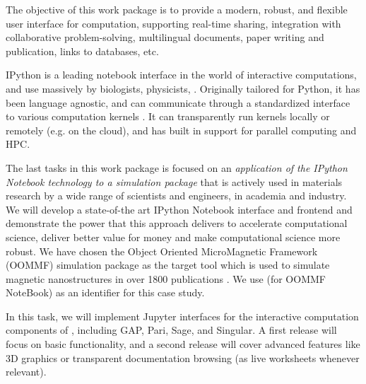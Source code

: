 \begin{workpackage}[id=UI,wphases=24-48,
  title=User Interfaces,
  PSRM=1,
  JURM=12, %
  USHRM=12, %
  LLRM=1, %
  SARM=1, %
  UKRM=1, %
  UBRM=1, %
  USORM=21] %

\begin{wpobjectives}
  The objective of this work package is to provide a modern, robust,
  and flexible user interface for computation, supporting real-time
  sharing, integration with collaborative problem-solving,
  multilingual documents, paper writing and publication, links to
  databases, etc.
\end{wpobjectives}

\begin{wpdescription}


  IPython is a leading notebook interface in the world of interactive
  computations, and use massively by biologists, physicists, . Originally tailored for Python, it has been
  language agnostic, and can communicate through a standardized
  interface to various computation kernels . It can
  transparently run kernels locally or remotely (e.g. on the cloud),
  and has built in support for parallel computing and HPC.

  The last tasks in this work package is focused on an
  \emph{application of the IPython Notebook technology to a simulation
    package} that is actively used in materials research by a wide
  range of scientists and engineers, in academia and industry. We will
  develop a state-of-the art IPython Notebook interface and frontend
  and demonstrate the power that this approach delivers to accelerate
  computational science, deliver better value for money and make
  computational science more robust.  We have chosen the Object
  Oriented MicroMagnetic Framework (OOMMF) simulation package
  \cite{OOMMF-url} as the target tool which is used to simulate
  magnetic nanostructures in over 1800 publications
  \cite{OOMMF-citations-url}. We use \OOMMFNB{} (for OOMMF NoteBook) as
  an identifier for this case study.

\end{wpdescription}

\begin{tasklist}
\begin{task}[title=Uniform notebook interface for all interactive components,id=ipython-kernels]
  In this task, we will implement Jupyter interfaces for the
  interactive computation components of \TheProject, including GAP,
  Pari, Sage, and Singular. A first release
   will focus on basic functionality,
  and a second release  will cover advanced
  features like 3D graphics or transparent documentation browsing (as
  live worksheets whenever relevant).


\end{task}
\end{tasklist}
\end{workpackage}
